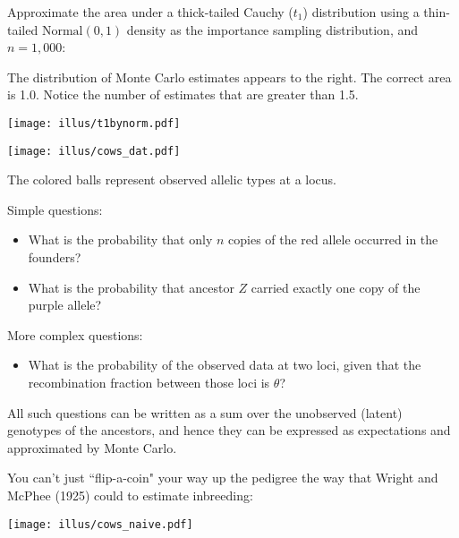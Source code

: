 Approximate the area under a thick-tailed Cauchy ($t_1$) distribution using a thin-tailed $\mathrm{Normal}(0,1)$ density as the importance sampling distribution, and $n=1,000$:

\begin{minipage}{.4\textwidth}
The distribution of Monte Carlo estimates appears to the right.  The correct area is 1.0.  Notice the number of estimates that are greater than 1.5.
\end{minipage}
\hfill
\begin{minipage}{.5\textwidth}
\begin{center}
\texttt{[image: illus/t1bynorm.pdf]}
\end{center} 
\end{minipage}





\begin{center}
\texttt{[image: illus/cows\_dat.pdf]}
\end{center}
The colored balls represent observed allelic types at a locus.

Simple questions:
\begin{itemize}
\item What is the probability that only $n$ copies of the red allele occurred in the founders?
\item What is the probability that ancestor $Z$ carried exactly one copy of the purple allele?
\end{itemize}
More complex questions:
\begin{itemize}
\item What is the probability of the observed data at two loci, given that the recombination fraction between those loci is $\theta$?
\end{itemize}
All such questions can be written as a sum over the unobserved (latent) genotypes of the ancestors, and hence they can be expressed as expectations and approximated by Monte Carlo.  

You can't just ``flip-a-coin" your way up the pedigree the way that Wright and McPhee (1925) could to estimate inbreeding:
\begin{center}
\texttt{[image: illus/cows\_naive.pdf]}
\end{center}

